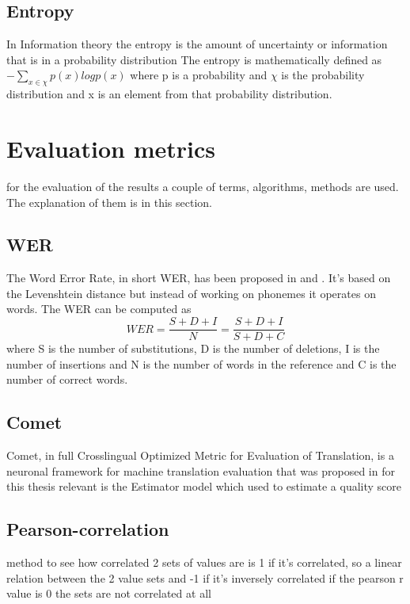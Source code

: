 \subsection{Entropy}
\label{entropy}
In Information theory the entropy is the amount of uncertainty or information that is in a probability distribution
The entropy is mathematically defined as $- \sum_{x\in \chi} p(x) log p(x)$ where p is a probability and $\chi$ is the probability distribution and x is an element from that probability distribution.

\section{Evaluation metrics}
 for the evaluation of the results a couple of terms, algorithms, methods are used. The explanation of them is in this section. 
 
\subsection{WER}
\label{wer}
The Word Error Rate, in short WER, has been proposed in \cite{woodard1982} and \cite{morris2004}.
It's based on the Levenshtein distance but instead of working on phonemes it operates on words.
The WER can be computed as $$WER=\frac{S+D+I}{N}=\frac{S+D+I}{S+D+C}$$ where S is the number of substitutions, D is the number of deletions, I is the number of insertions and N is the number of words in the reference and C is the number of correct words.

\subsection{Comet}
Comet, in full Crosslingual Optimized Metric for Evaluation of Translation, is a neuronal framework for machine translation evaluation that was proposed in \cite{rei-etal-2020-comet} 
for this thesis relevant is the Estimator model which used to estimate a quality score 

\subsection{Pearson-correlation}
method to see how correlated 2 sets of values are
is 1 if it's correlated, so a linear relation between the 2 value sets and -1 if it's inversely correlated 
if the pearson r value is 0 the sets are not correlated at all


